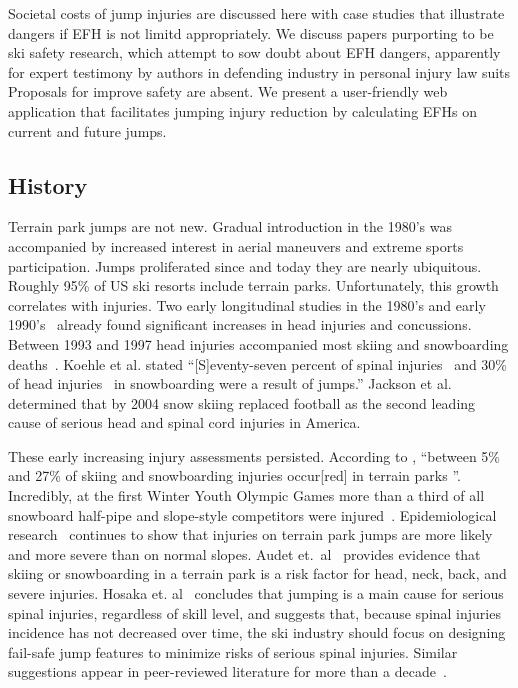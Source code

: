 \documentclass[smallextended]{svjour3}       %
\begin{document}
Societal costs of jump injuries are discussed here with case studies that illustrate dangers if EFH is not limitd appropriately. We discuss papers
purporting to be ski safety research, which attempt to sow doubt about EFH dangers, apparently for expert testimony by authors in defending industry in personal injury law suits Proposals for improve safety are absent. We  present a user-friendly web application that facilitates jumping injury reduction
by calculating EFHs on current and future jumps.  

\subsection{History}
\label{sec:hist}
%
Terrain park jumps are not new. Gradual
introduction in the 1980's was accompanied by increased interest in aerial maneuvers
and extreme sports participation.  Jumps proliferated since and today they are nearly ubiquitous. Roughly 95\% of US ski resorts include terrain parks. Unfortunately, this
growth correlates with injuries. Two early longitudinal studies in
the 1980's and early 1990's~\cite{Deibert1998,Furrer1995} already found
significant increases in head injuries and concussions. Between 1993 and 1997 head injuries accompanied most skiing and snowboarding deaths~\cite{CPSC1999}. Koehle et al.  \cite{Koehle2002} stated ``[S]eventy-seven percent of spinal
injuries~\cite{Tarazi1999} and 30\% of head injuries~\cite{Fukuda2001} in
snowboarding were a result of jumps.'' Jackson et al.~\cite{Jackson2004}
determined that by 2004 snow skiing replaced football as the second leading
cause of serious head and spinal cord injuries in America.

These early increasing injury assessments persisted. According to
\cite{Russell2014}, ``between 5\% and 27\% of skiing and snowboarding injuries
occur[red] in terrain parks
\cite{Bridges2003,Goulet2007,Moffat2009,Greve2009,Brooks2010,Ruedl2013}''.
Incredibly, at the first Winter Youth Olympic Games more than a third of all
snowboard half-pipe and slope-style competitors were
injured~\cite{Ruedl2012}. Epidemiological research~\cite{Carus2016,Audet2019a,Hosaka2020}  continues to
show that injuries on terrain park jumps are
more likely and more severe than on normal slopes.
Audet et.~al~\cite{Audet2019a} provides evidence that skiing or
snowboarding in a terrain park is a risk factor for head, neck, back, and
severe injuries. Hosaka et. al~\cite{Hosaka2020} concludes that jumping is a main cause for serious spinal injuries, regardless of skill level, and
suggests that, because spinal injuries incidence  has not decreased over
time,  the ski industry should focus on designing fail-safe jump
features to minimize risks of serious spinal injuries. Similar suggestions appear in peer-reviewed literature for more than a
decade~\cite{Hubbard2009,Swedberg2012,McNeil2012,McNeil2012a,Hubbard2015,Levy2015,Petrone2017,Moore2018}.
\end{document}
